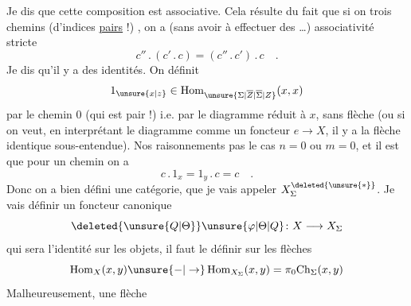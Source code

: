Je dis que cette composition est associative. Cela
résulte du fait que si on  trois chemins (d'indices
\uline{pairs} !)
,
on a \unsure{$^{*}$} (sans avoir à effectuer des \ldots)
associativité stricte
\[
c''\mathbin{.}(c'\mathbin{.}c)=(c''\mathbin{.}c')\mathbin{.}c\quad .
\]
Je dis qu'il y a des identités. On définit
\[
1_{\unsure{x|z}}\in\operatorname{Hom}_{\unsure{\Sigma|\overline{Z}|\overline{\Sigma}|Z}}(x,x)
\]
par le chemin   $0$ (qui est pair !)
i.e. par le diagramme réduit à $x$, sans flèche
(ou si on veut, en interprétant le diagramme comme un
foncteur $e\to X$, il y a la flèche identique
sous-entendue). Nos raisonnements 
pas le cas $n=0$ ou $m=0$, et il est   que
pour un chemin
on a
\[
c\mathbin{.}1_x=1_y\mathbin{.}c=c\quad .
\]
Donc on a bien défini une catégorie, que je
vais appeler $X^{\deleted{\unsure{*}}}_{\Sigma}$. Je vais définir un
foncteur canonique
\[
\deleted{\unsure{Q|\Theta}}\unsure{\varphi|\Theta|Q}\colon X\longrightarrow X_{\Sigma}
\]
qui sera l'identité sur les objets, il faut le
définir sur les flèches
\[
\operatorname{Hom}_X(x,y)\unsure{\mathord{-}|\to}\operatorname{Hom}_{X_{\Sigma}}(x,y)=\pi_0\mathrm{Ch}_{\Sigma}(x,y)
\]
Malheureusement, une flèche
